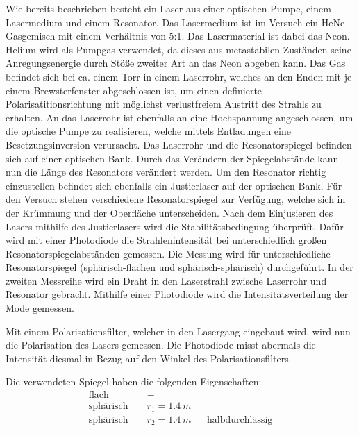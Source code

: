 Wie bereits beschrieben besteht ein Laser aus einer optischen Pumpe, einem Lasermedium und einem Resonator.
Das Lasermedium ist im Versuch ein HeNe-Gasgemisch mit einem Verhältnis von 5:1.
Das Lasermaterial ist dabei das Neon.
Helium wird als Pumpgas verwendet, da dieses aus metastabilen Zuständen seine Anregungsenergie durch Stöße zweiter Art an das Neon abgeben kann.
Das Gas befindet sich bei ca. einem Torr in einem Laserrohr, welches an den Enden mit je einem Brewsterfenster abgeschlossen ist, um einen
definierte Polarisatitionsrichtung mit möglichst verlustfreiem Austritt des Strahls zu erhalten.
An das Laserrohr ist ebenfalls an eine Hochspannung angeschlossen, um die optische Pumpe zu realisieren, welche mittels Entladungen eine Besetzungsinversion verursacht.
Das Laserrohr und die Resonatorspiegel befinden sich auf einer optischen Bank.
Durch das Verändern der Spiegelabstände kann nun die Länge des Resonators verändert werden.
Um den Resonator richtig einzustellen befindet sich ebenfalls ein Justierlaser auf der optischen Bank.
Für den Versuch stehen verschiedene Resonatorspiegel zur Verfügung, welche sich in der Krümmung und der Oberfläche unterscheiden.
Nach dem Einjusieren des Lasers mithilfe des Justierlasers wird die Stabilitätsbedingung überprüft.
Dafür wird mit einer Photodiode die Strahlenintensität bei unterschiedlich großen Resonatorspiegelabständen gemessen.
Die Messung wird für unterschiedliche Resonatorspiegel (sphärisch-flachen und sphärisch-sphärisch) durchgeführt.
In der zweiten Messreihe wird ein Draht in den Laserstrahl zwische Laserrohr und Resonator gebracht.
Mithilfe einer Photodiode wird die Intensitätsverteilung der Mode gemessen.

Mit einem Polarisationsfilter, welcher in den Lasergang eingebaut wird, wird nun die Polarisation des Lasers gemessen.
Die Photodiode misst abermals die Intensität diesmal in Bezug auf den Winkel des Polarisationsfilters.

Die verwendeten Spiegel haben die folgenden Eigenschaften:
\begin{align*}
\text{flach }      &&       -       && \\
\text{sphärisch }  && r_{1}=\SI{1.4}{m} && \\
\text{sphärisch }  && r_{2}=\SI{1.4}{m} && \text{halbdurchlässig}\\.
\end{align*}
